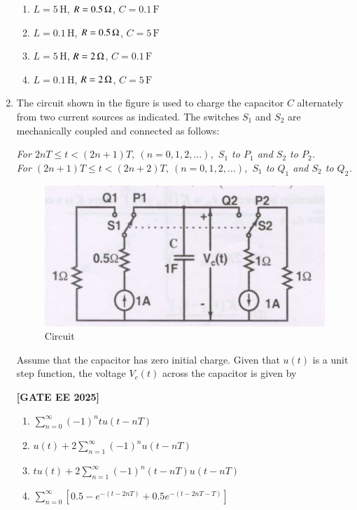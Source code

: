\documentclass[12pt]{article}
\begin{document}
\begin{enumerate}[leftmargin=*, label=\textbf{Q.\arabic*:}]
\begin{enumerate}
  \item $L=5\,\text{H}$, $R=0.5\,\ohm$, $C=0.1\,\text{F}$
  \item $L=0.1\,\text{H}$, $R=0.5\,\ohm$, $C=5\,\text{F}$
  \item $L=5\,\text{H}$, $R=2\,\ohm$, $C=0.1\,\text{F}$
  \item $L=0.1\,\text{H}$, $R=2\,\ohm$, $C=5\,\text{F}$
\end{enumerate}

\item The circuit shown in the figure is used to charge the capacitor $C$ alternately from two current sources as indicated. The switches $S_1$ and $S_2$ are mechanically coupled and connected as follows:

\textit{For $2nT \leq t < (2n+1)T,\ (n=0,1,2,\ldots)$,\ $S_1$ to $P_1$ and $S_2$ to $P_2$.}\\
\textit{For $(2n+1)T \leq t < (2n+2)T,\ (n=0,1,2,\ldots)$,\ $S_1$ to $Q_1$ and $S_2$ to $Q_2$.}
\begin{figure}[H]\centering
\includegraphics[width=0.7\columnwidth]{figs/q23.png}
\caption{Circuit}
\label{fig:q23}
\end{figure}
Assume that the capacitor has zero initial charge. Given that $u(t)$ is a unit step function, the voltage $V_c(t)$ across the capacitor is given by
 
\noindent \textbf{[GATE EE 2025]}
\begin{enumerate}
  \item $\displaystyle\sum_{n=0}^\infty (-1)^n t u(t-nT)$
  \item $\displaystyle u(t) + 2 \sum_{n=1}^\infty (-1)^n u(t-nT)$
  \item $\displaystyle t u(t) + 2 \sum_{n=1}^\infty (-1)^n (t-nT)u(t-nT)$
  \item $\displaystyle \sum_{n=0}^\infty \left[ 0.5 - e^{-(t-2nT)} + 0.5e^{-(t-2nT-T)} \right]$
\end{enumerate}

\newpage


\end{enumerate}
\end{document}
